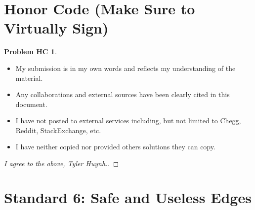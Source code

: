 \documentclass[11pt]{article}
\theoremstyle{definition}
\theoremstyle{definition}
\newtheorem*{requiredHC}{Problem HC}
\theoremstyle{definition}
\begin{document}
\newpage
\section*{Honor Code (Make Sure to Virtually Sign)} \label{HonorCode}
\hypertarget{HonorCode}{}

\begin{requiredHC}
\begin{itemize}
\item My submission is in my own words and reflects my understanding of the material.
\item Any collaborations and external sources have been clearly cited in this document.
\item I have not posted to external services including, but not limited to Chegg, Reddit, StackExchange, etc.
\item I have neither copied nor provided others solutions they can copy.
\end{itemize}

\end{requiredHC}

\begin{proof}[I agree to the above, Tyler Huynh.]
\end{proof}


\newpage
\setcounter{section}{5}
\section{Standard 6: Safe and Useless Edges}
\end{document}
